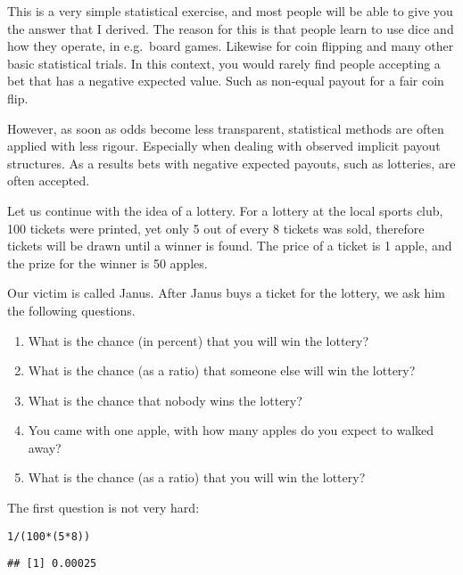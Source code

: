 \documentclass[a4paper]{book}\usepackage{graphicx, color}
\makeatletter
\newenvironment{kframe}{%
 \def\at@end@of@kframe{}%
 \ifinner\ifhmode%
  \def\at@end@of@kframe{\end{minipage}}%
  \begin{minipage}{\columnwidth}%
 \fi\fi%
 \def\FrameCommand##1{\hskip\@totalleftmargin \hskip-\fboxsep
 \colorbox{shadecolor}{##1}\hskip-\fboxsep
     \hskip-\linewidth \hskip-\@totalleftmargin \hskip\columnwidth}%
 \MakeFramed {\advance\hsize-\width
   \@totalleftmargin\z@ \linewidth\hsize
   \@setminipage}}%
 {\par\unskip\endMakeFramed%
 \at@end@of@kframe}
\newenvironment{knitrout}{}{} %
\makeatother
\begin{document}
This is a very simple statistical exercise, and most people will be able
to give you the answer that I derived. The reason for this is that
people learn to use dice and how they operate, in e.g.~board games.
Likewise for coin flipping and many other basic statistical trials. In
this context, you would rarely find people accepting a bet that has a
negative expected value. Such as non-equal payout for a fair coin flip.

However, as soon as odds become less transparent, statistical methods
are often applied with less rigour. Especially when dealing with
observed implicit payout structures. As a results bets with negative
expected payouts, such as lotteries, are often accepted.

Let us continue with the idea of a lottery. For a lottery at the local
sports club, 100 tickets were printed, yet only 5 out of every 8 tickets
was sold, therefore tickets will be drawn until a winner is found. The
price of a ticket is 1 apple, and the prize for the winner is 50 apples.

Our victim is called Janus. After Janus buys a ticket for the lottery,
we ask him the following questions.

\begin{enumerate}
\def\labelenumi{\arabic{enumi}.}
\itemsep1pt\parskip0pt
\item
  What is the chance (in percent) that you will win the lottery?
\item
  What is the chance (as a ratio) that someone else will win the
  lottery?
\item
  What is the chance that nobody wins the lottery?
\item
  You came with one apple, with how many apples do you expect to walked
  away?
\item
  What is the chance (as a ratio) that you will win the lottery?
\end{enumerate}

The first question is not very hard:

\begin{knitrout}
\color{fgcolor}\begin{kframe}
\begin{alltt}
1/(100 * (5 * 8))
\end{alltt}
\begin{verbatim}
## [1] 0.00025
\end{verbatim}
\end{kframe}
\end{knitrout}
\end{document}
